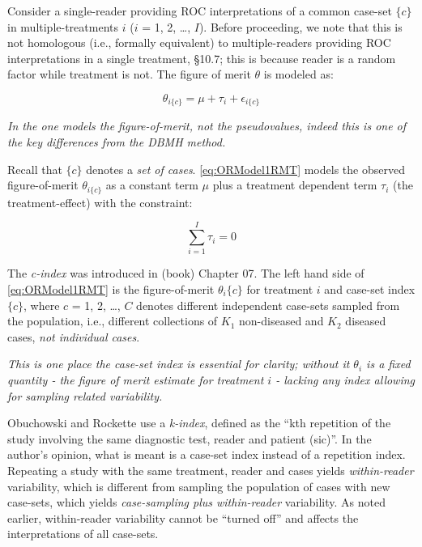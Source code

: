 \documentclass[
]{book}
\begin{document}
Consider a single-reader providing ROC interpretations of a common case-set \(\{c\}\) in multiple-treatments \(i\) (\(i\) = 1, 2, \ldots, \(I\)). Before proceeding, we note that this is not homologous (i.e., formally equivalent) to multiple-readers providing ROC interpretations in a single treatment, §10.7; this is because reader is a random factor while treatment is not. The figure of merit \(\theta\) is modeled as:

\begin{equation}
\theta_{i\{c\}}=\mu+\tau_i+\epsilon_{i\{c\}}
\label{eq:ORModel1RMT}
\end{equation}

\emph{In the \citep{RN1450} one models the figure-of-merit, not the pseudovalues, indeed this is one of the key differences from the DBMH method.}

Recall that \(\{c\}\) denotes a \emph{set of cases}. \eqref{eq:ORModel1RMT} models the observed figure-of-merit \(\theta_{i\{c\}}\) as a constant term \(\mu\) plus a treatment dependent term \(\tau_i\) (the treatment-effect) with the constraint:

\begin{equation}
\sum_{i=1}^{I}\tau_i=0
\label{eq:ConstraintTau}
\end{equation}

The \emph{c-index} was introduced in (book) Chapter 07. The left hand side of \eqref{eq:ORModel1RMT} is the figure-of-merit \(\theta_i\{c\}\) for treatment \(i\) and case-set index \(\{c\}\), where \(c\) = 1, 2, \ldots, \(C\) denotes different independent case-sets sampled from the population, i.e., different collections of \(K_1\) non-diseased and \(K_2\) diseased cases, \emph{not individual cases}.

\emph{This is one place the case-set index is essential for clarity; without it \(\theta_i\) is a fixed quantity - the figure of merit estimate for treatment \(i\) - lacking any index allowing for sampling related variability.}

Obuchowski and Rockette use a \emph{k-index}, defined as the ``kth repetition of the study involving the same diagnostic test, reader and patient (sic)''. In the author's opinion, what is meant is a case-set index instead of a repetition index. Repeating a study with the same treatment, reader and cases yields \emph{within-reader} variability, which is different from sampling the population of cases with new case-sets, which yields \emph{case-sampling plus within-reader} variability. As noted earlier, within-reader variability cannot be ``turned off'' and affects the interpretations of all case-sets.
\end{document}
